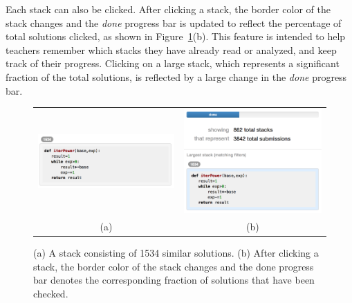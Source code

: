 Each stack can also be clicked. After clicking a stack, the border color of the stack changes and the \emph{done} progress bar is updated to reflect the percentage of total solutions clicked, as shown in Figure~\ref{stacks}(b). This feature is intended to help teachers remember which stacks they have already read or analyzed, and keep track of their progress. Clicking on a large stack, which represents a significant fraction of the total solutions, is reflected by a large change in the \emph{done} progress bar. 

\begin{figure}[htpb]
\begin{tabular}{c | c}
\begin{minipage}{.5\linewidth}
\centering
\includegraphics[width=0.95\linewidth]{Body/figures/overcode/stackScreenShot.png}
\end{minipage}
&
\begin{minipage}{.5\linewidth}
\centering
\includegraphics[width=0.95\linewidth]{Body/figures/overcode/checkDone.png}
\end{minipage}
\\
(a) & (b)
\end{tabular}
\caption{(a) A stack consisting of 1534 similar  solutions. (b) After clicking a stack, the border color of the stack changes and the done progress bar denotes the corresponding fraction of solutions that have been checked.}
\label{stacks}
\end{figure}

